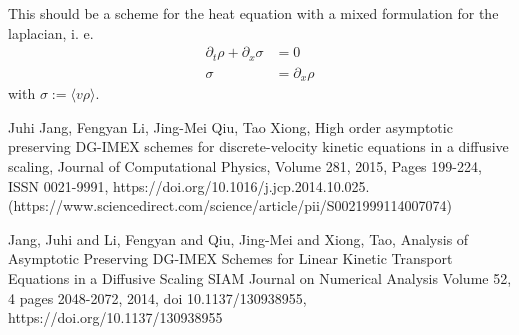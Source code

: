 \documentclass[]{article}
\begin{document}
This should be a scheme for the heat equation with a mixed formulation for the laplacian, i. e.
\begin{align*}
\partial_t \rho + \partial_x \sigma & = 0 \\
\sigma & = \partial_x \rho
\end{align*}
with $\sigma := \langle v \rho \rangle$.

\begin{thebibliography}{9}
	Juhi Jang, Fengyan Li, Jing-Mei Qiu, Tao Xiong,
	High order asymptotic preserving DG-IMEX schemes for discrete-velocity kinetic equations in a diffusive scaling,
	Journal of Computational Physics,
	Volume 281,
	2015,
	Pages 199-224,
	ISSN 0021-9991,
	https://doi.org/10.1016/j.jcp.2014.10.025.
	(https://www.sciencedirect.com/science/article/pii/S0021999114007074)
	
		Jang, Juhi and Li, Fengyan and Qiu, Jing-Mei and Xiong, Tao,
		Analysis of Asymptotic Preserving DG-IMEX Schemes for Linear Kinetic Transport Equations in a Diffusive Scaling
		SIAM Journal on Numerical Analysis
		Volume 52, 4
		pages 2048-2072,
		2014,
		doi 10.1137/130938955,
			https://doi.org/10.1137/130938955


\end{thebibliography}
\end{document}
